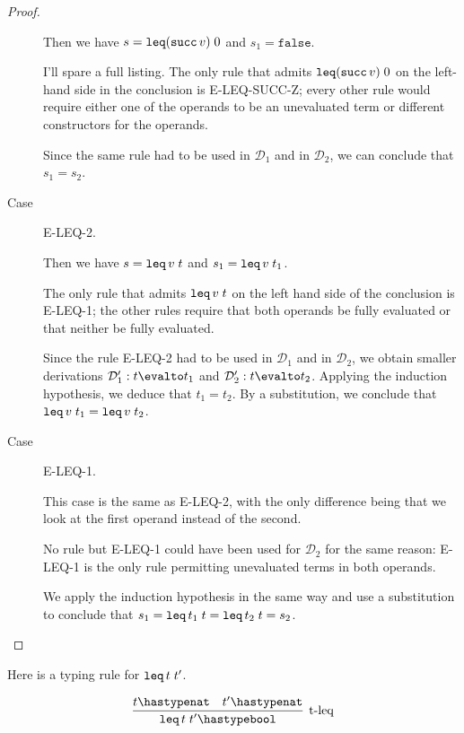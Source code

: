 \documentclass[11pt,letterpaper]{article}
\begin{document}
\begin{proof}
\begin{description}
            Then we have $s = \operatorname{\mathtt{leq}} (\operatorname{\mathtt{succ}} v) \; 0$
            and $s_1 = \mathtt{false}$.

            I'll spare a full listing.
            The only rule that admits $\operatorname{\mathtt{leq}} (\operatorname{\mathtt{succ}} v) \; 0$ on the left-hand
            side in the conclusion is E-LEQ-SUCC-Z; every other rule would
            require either one of the operands to be an unevaluated term or
            different constructors for the operands.

            Since the same rule had to be used in $\mathcal{D}_1$ and in
            $\mathcal{D}_2$, we can conclude that $s_1 = s_2$.

        \item[Case] E-LEQ-2.

            Then we have $s = \operatorname{\mathtt{leq}} v \; t$
            and $s_1 = \operatorname{\mathtt{leq}} v \; t_1$.

            The only rule that admits $\operatorname{\mathtt{leq}} v \; t$ on the left hand side of the
            conclusion is E-LEQ-1; the other rules require that both operands
            be fully evaluated or that neither be fully evaluated.

            Since the rule E-LEQ-2 had to be used in $\mathcal{D}_1$ and in
            $\mathcal{D}_2$, we obtain smaller derivations
            $\mathcal{D}_1^\prime : t \evalto t_1$
            and $\mathcal{D}_2^\prime : t \evalto t_2$.
            Applying the induction hypothesis, we deduce that
            $t_1 = t_2$.
            By a substitution, we conclude that $\operatorname{\mathtt{leq}} v \; t_1 = \operatorname{\mathtt{leq}} v \; t_2$.

        \item[Case] E-LEQ-1.

            This case is the same as E-LEQ-2, with the only difference being
            that we look at the first operand instead of the second.

            No rule but E-LEQ-1 could have been used for $\mathcal{D}_2$ for
            the same reason: E-LEQ-1 is the only rule permitting unevaluated
            terms in both operands.

            We apply the induction hypothesis in the same way and use a
            substitution to conclude that
            $s_1 = \operatorname{\mathtt{leq}} t_1 \; t = \operatorname{\mathtt{leq}} t_2 \; t = s_2$.
    \end{description}
\end{proof}

Here is a typing rule for $\operatorname{\mathtt{leq}} t \; t^\prime$.

\begin{equation*}
    \infer[\text{t-leq}]{\Leq{t}{t^\prime} \hastype \mathtt{bool}}{
        t \hastype \mathtt{nat}
        &
        t^\prime \hastype \mathtt{nat}
    }
\end{equation*}
\end{document}
